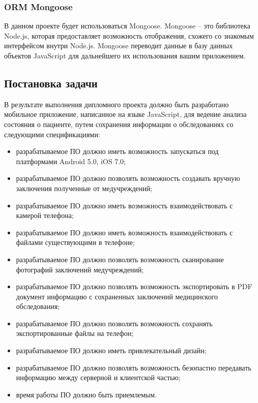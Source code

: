 \subsubsection{ORM Mongoose}

В данном проекте будет использоваться Mongoose. Mongoose -- это библиотека Node.js, которая предоставляет возможность отображения, схожего со знакомым интерфейсом внутри Node.js. Mongoose переводит данные в базу данных объектов JavaScript для дальнейшего их использования вашим приложением.

\subsection{Постановка задачи}
\label{sub:domain:task}
В результате выполнения дипломного проекта должно быть разработано мобильное приложение, написанное на языке JavaScript, для ведение анализа состояния о пациенте, путем сохранения информации о обследованиях со следующими спецификациями:
\begin{itemize}
  \item разрабатываемое ПО должно иметь возможность запускаться под платформами Android 5.0, iOS 7.0;
  \item разрабатываемое ПО должно позволять возможность создавать вручную заключения полученные от медучреждений;
  \item разрабатываемое ПО должно иметь возможность взаимодействовать с камерой телефона;
  \item разрабатываемое ПО должно иметь возможность взаимодействовать с файлами существующими в телефоне;
  \item разрабатываемое ПО должно позволять возможность сканирование фотографий заключений медучреждений;
  \item разрабатываемое ПО должно позволять возможность экспортировать в PDF документ информацию с сохраненных заключений медицинского обследования;
  \item разрабатываемое ПО должно позволять возможность сохранять экспортированные файлы на телефон;
  \item разрабатываемое ПО должно иметь привлекательный дизайн;
  \item разрабатываемое ПО должно позволять возможность безопастно передавать информацию между серверной и клиентской частью;
  \item время работы ПО должно быть приемлемым.
\end{itemize}